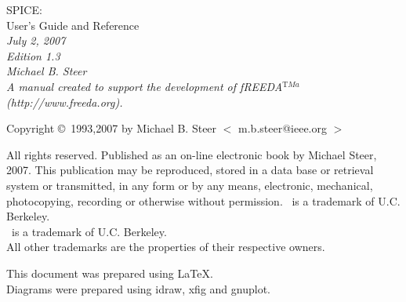 \pagestyle{headings}

\vspace*{1in}
\begin{center}
    {\Huge SPICE:}           \\[1in]
    {\Large User's Guide and Reference}
     \\[0.5in] \large\sl
                  July 2, 2007\\[0.5in]
                  Edition 1.3
          \\[0.5in]
          Michael B. Steer
              \\[2in]
              A manual created to support the development of fREEDA$^{\mathrm TMa}$ (http://www.freeda.org).
\end{center}
\newpage

\noindent Copyright \copyright\ 1993,2007 by  Michael B.
Steer  $<$ m.b.steer@ieee.org $>$
\vfill

\noindent All rights reserved. Published as an on-line electronic book by Michael Steer, 2007. This publication may be reproduced, stored in
a data base or retrieval system or transmitted, in any form or by
any means, electronic, mechanical, photocopying, recording or
otherwise without permission. \vfill
\noindent\spicetwo\ is a trademark of U.C. Berkeley.\\
\spicethree\ is a trademark of U.C. Berkeley.\\
All other trademarks are the properties of their respective owners.

\vfill
\noindent This document was prepared using \LaTeX.\\
Diagrams were prepared using idraw, xfig and gnuplot.
\vfill

